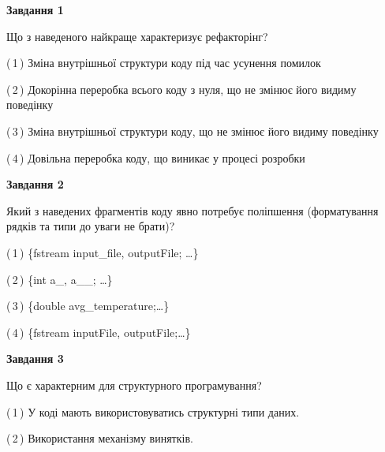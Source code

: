 \documentclass[10pt, ukrainian]{article}
\begin{document}
{
\begin {large}
{\begin {center}\textbf{Завдання 1}\end {center}}\par
Що з наведеного найкраще характеризує рефакторінг?\par
\vspace{2mm}



(\,1\,) Зміна внутрішньої структури коду під час усунення помилок%



(\,2\,) Докорінна переробка всього коду з нуля,  що не змінює його видиму поведінку%



(\,3\,) Зміна внутрішньої структури коду, що не змінює його видиму поведінку%



(\,4\,) Довільна переробка коду, що виникає у процесі розробки%


{\begin {center}\textbf{Завдання 2}\end {center}}\par
Який з наведених фрагментів коду явно потребує поліпшення (форматування рядків та типи до уваги не брати)?\par
\vspace{2mm}



(\,1\,) \{fstream input\_file, outputFile; …\}%



(\,2\,) \{int a\_, a\_\_; …\}%



(\,3\,) \{double avg\_temperature;…\} %



(\,4\,) \{fstream inputFile, outputFile;…\} %


{\begin {center}\textbf{Завдання 3}\end {center}}\par
Що є характерним для структурного програмування?\par
\vspace{2mm}



(\,1\,) У коді мають використовуватись структурні типи даних. %



(\,2\,) Використання механізму винятків. %




\end{large}}
\end{document}
